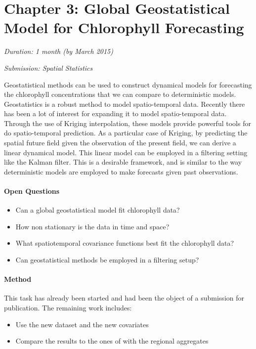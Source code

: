 \section{Chapter 3: Global Geostatistical Model for Chlorophyll Forecasting}

\noindent
\emph{Duration: 1 month (by March 2015)}

\noindent
\emph{Submission: Spatial Statistics}

Geostatistical methods can be used to construct dynamical models for forecasting the chlorophyll concentrations that we can compare to deterministic models. Geostatistics is a robust method to model spatio-temporal data. Recently there has been a lot of interest for expanding it to model spatio-temporal data. Through the use of Kriging interpolation, these models provide powerful tools for do spatio-temporal prediction. As a particular case of Kriging, by predicting the spatial future field given the observation of the present field, we can derive a linear dynamical model. This linear model can be employed in a filtering setting like the Kalman filter. This is a desirable framework, and is similar to the way deterministic models are employed to make forecasts given past observations. 

\paragraph{Open Questions}

\begin{itemize}
  \item Can a global geostatistical model fit chlorophyll data?
  \item How non stationary is the data in time and space?
  \item What spatiotemporal covariance functions best fit the chlorophyll data?
  \item Can geostatistical methods be employed in a filtering setup?
\end{itemize}

\paragraph{Method}

This task has already been started and had been the object of a submission for publication. The remaining work includes:
\begin{itemize}
  \item Use the new dataset and the new covariates
  \item Compare the results to the ones of with the regional aggregates
\end{itemize}

